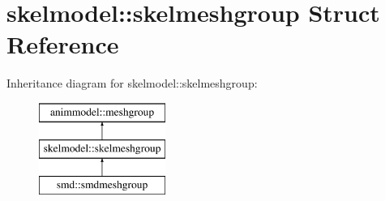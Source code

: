 \hypertarget{structskelmodel_1_1skelmeshgroup}{}\section{skelmodel\+:\+:skelmeshgroup Struct Reference}
\label{structskelmodel_1_1skelmeshgroup}
Inheritance diagram for skelmodel\+:\+:skelmeshgroup\+:\begin{figure}[H]
\begin{center}
\leavevmode
\includegraphics[height=3.000000cm]{structskelmodel_1_1skelmeshgroup}
\end{center}
\end{figure}
